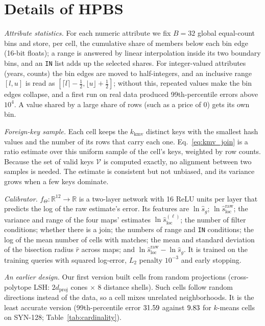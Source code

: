 \documentclass[sigconf,nonacm]{acmart}
\begin{document}
\appendix
\section{Details of HPBS}\label{app:hpbs}
\emph{Attribute statistics.} For each numeric attribute we fix $B=32$ global equal-count bins and store, per cell, the cumulative share of members below each bin edge (16-bit floats); a range is answered by linear interpolation inside its two boundary bins, and an \texttt{IN} list adds up the selected shares. For integer-valued attributes (years, counts) the bin edges are moved to half-integers, and an inclusive range $[l,u]$ is read as $[\lceil l\rceil-\tfrac12,\lfloor u\rfloor+\tfrac12]$; without this, repeated values make the bin edges collapse, and a first run on real data produced 99th-percentile errors above $10^4$. A value shared by a large share of rows (such as a price of 0) gets its own bin.

\emph{Foreign-key sample.} Each cell keeps the $k_{\text{kmv}}$ distinct keys with the smallest hash values and the number of its rows that carry each one. Eq.~\eqref{eq:kmv_join} is a ratio estimate over this uniform sample of the cell's keys, weighted by row counts. Because the set of valid keys $\mathcal{V}$ is computed exactly, no alignment between two samples is needed. The estimate is consistent but not unbiased, and its variance grows when a few keys dominate.

\emph{Calibrator.} $f_\Theta:\mathbb{R}^{12}\to\mathbb{R}$ is a two-layer network with 16 ReLU units per layer that predicts the log of the raw estimate's error. Its features are $\ln\hat s_g$; $\ln\hat s^{\text{raw}}_{\text{loc}}$; the variance and range of the four maps' estimates $\ln\hat s^{(\ell)}_{\text{loc}}$; the number of filter conditions; whether there is a join; the numbers of range and \texttt{IN} conditions; the log of the mean number of cells with matches; the mean and standard deviation of the bisection radius $\hat r$ across maps; and $\ln\hat s^{\text{raw}}_{\text{loc}}-\ln\hat s_g$. It is trained on the training queries with squared log-error, $L_2$ penalty $10^{-3}$ and early stopping.

\emph{An earlier design.} Our first version built cells from random projections (cross-polytope LSH: $2d_{\text{proj}}$ cones $\times$ 8 distance shells). Such cells follow random directions instead of the data, so a cell mixes unrelated neighborhoods. It is the least accurate version (99th-percentile error $31.59$ against $9.83$ for $k$-means cells on SYN-128; Table~\ref{tab:cardinality}).
\end{document}
